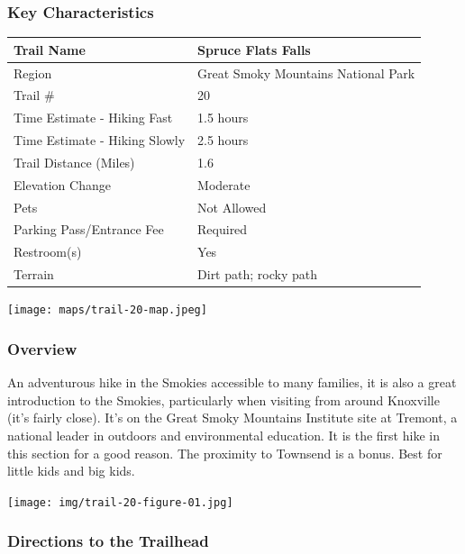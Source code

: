 \documentclass[
  letterpaper,
  DIV=11,
  numbers=noendperiod]{scrartcl}
\begin{document}
\hypertarget{key-characteristics-19}{%
\subsubsection{Key Characteristics}\label{key-characteristics-19}}

\begin{longtable}[]{@{}ll@{}}
\toprule\noalign{}
Trail Name & Spruce Flats Falls \\
\midrule\noalign{}
\endhead
\bottomrule\noalign{}
\endlastfoot
Region & Great Smoky Mountains National Park \\
Trail \# & 20 \\
Time Estimate - Hiking Fast & 1.5 hours \\
Time Estimate - Hiking Slowly & 2.5 hours \\
Trail Distance (Miles) & 1.6 \\
Elevation Change & Moderate \\
Pets & Not Allowed \\
Parking Pass/Entrance Fee & Required \\
Restroom(s) & Yes \\
Terrain & Dirt path; rocky path \\
\end{longtable}

\texttt{[image: maps/trail-20-map.jpeg]}

\hypertarget{overview-19}{%
\subsubsection{Overview}\label{overview-19}}

An adventurous hike in the Smokies accessible to many families, it is
also a great introduction to the Smokies, particularly when visiting
from around Knoxville (it's fairly close). It's on the Great Smoky
Mountains Institute site at Tremont, a national leader in outdoors and
environmental education. It is the first hike in this section for a good
reason. The proximity to Townsend is a bonus. Best for little kids and
big kids.

\texttt{[image: img/trail-20-figure-01.jpg]}

\hypertarget{directions-to-the-trailhead-19}{%
\subsubsection{Directions to the
Trailhead}\label{directions-to-the-trailhead-19}}
\end{document}
